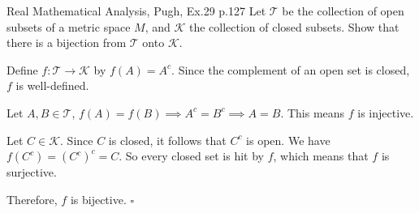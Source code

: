\begin{problem}{}{}{Real Mathematical Analysis, Pugh, Ex.29 p.127}
Let $\mathcal{T}$ be the collection of open subsets of a metric space $M$, and $\mathcal{K}$ the collection of closed subsets.
Show that there is a bijection from $\mathcal{T}$ onto $\mathcal{K}$.
\end{problem}

\begin{solution}
    Define \(f: \mathcal{T} \to \mathcal{K} \) by \(f(A) = A^c\). Since the complement
    of an open set is closed, $f$ is well-defined.

    Let \(A, B \in \mathcal{T}\), \(f(A) = f(B) \implies A^c = B^c \implies A = B\).
    This means \(f\) is injective.

    Let \(C \in \mathcal{K}\). Since \(C\) is closed, it follows that \(C^c\) is open.
    We have \(f(C^c) = (C^c)^c = C\). So every closed set is hit by \(f\), which means that
    \(f\) is surjective.

    Therefore, \(f\) is bijective.
    \hfill $\square$   
\end{solution}